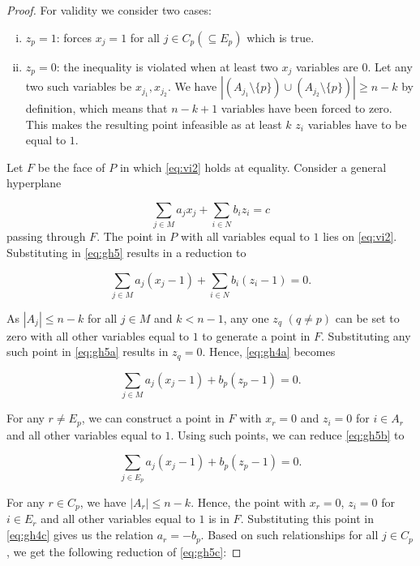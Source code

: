 \documentclass[12pt]{article}
\newcommand{\sm}{\setminus}
\begin{document}
\begin{proof}
For validity we consider two cases:

\begin{enumerate}[(i)]
\item $z_p = 1$: forces $x_j = 1$ for all $j \in C_p (\subseteq E_p)$ which is true.

\item $z_p = 0$: the inequality is violated when at least two $x_j$ variables are $0$. Let any two such variables be $x_{j_1},x_{j_2}$. We have $|(A_{j_1} \sm \{p\}) \cup (A_{j_2} \sm \{p\})| \geq n-k$ by definition, which means that $n-k+1$ variables have been forced to zero. This makes the resulting point infeasible as at least $k$ $z_i$ variables have to be equal to $1$.
\end{enumerate}

Let $F$ be the face of $P$ in which \eqref{eq:vi2} holds at equality. Consider a general hyperplane

\begin{equation}
\sum_{j \in M} a_j x_j + \sum_{i \in N} b_i z_i = c
\label{eq:gh5}
\end{equation}
passing through $F$. The point in $P$ with all variables equal to $1$ lies on \eqref{eq:vi2}. Substituting in \eqref{eq:gh5} results in a reduction to

\begin{equation}
\sum_{j \in M} a_j (x_j - 1) + \sum_{i \in N} b_i (z_i - 1) = 0.
\label{eq:gh5a}
\end{equation}

As $|A_j| \leq n-k$ for all $j \in M$ and $k<n-1$, any one $z_q$ $(q \neq p)$ can be set to zero with all other variables equal to $1$ to generate a point in $F$. Substituting any such point in \eqref{eq:gh5a} results in $z_q = 0$. Hence, \eqref{eq:gh4a} becomes

\begin{equation}
\sum_{j \in M} a_j (x_j - 1) + b_p (z_p - 1) = 0.
\label{eq:gh5b}
\end{equation}

For any $r \neq E_p$, we can construct a point in $F$ with $x_r = 0$ and $z_i = 0$ for $i \in A_r$ and all other variables equal to $1$. Using such points, we can reduce \eqref{eq:gh5b} to

\begin{equation}
\sum_{j \in E_p} a_j (x_j - 1) + b_p (z_p - 1) = 0.
\label{eq:gh5c}
\end{equation}

For any $r \in C_p$, we have $|A_r| \leq n-k$. Hence, the point with $x_r = 0$, $z_i = 0$ for $i \in E_r$ and all other variables equal to $1$ is in $F$. Substituting this point in \eqref{eq:gh4c} gives us the relation $a_r = -b_p$. Based on such relationships for all $j \in C_p$, we get the following reduction of \eqref{eq:gh5c}:


\end{proof}
\end{document}
